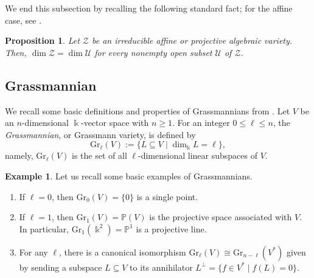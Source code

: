 \documentclass[a4,12pt]{amsart}
\numberwithin{equation}{section} %
\def\Gr{\mathrm{Gr}} %
\newtheorem{proposition}[theorem]{Proposition} %
\theoremstyle{definition} %
\newtheorem{example}[theorem]{Example} %
\begin{document}
We end this subsection by recalling the following standard fact; for the affine case, see \cite[Chapter~I, Proposition~1.10]{Hartshorne-book-1977}. 

\begin{proposition}\label{prop:open-subset-dim}
Let $\mathcal{Z}$ be an irreducible affine or projective algebraic variety. Then, $\dim \mathcal{Z}=\dim \mathcal{U}$ for every nonempty open subset $\mathcal{U}$ of $\mathcal{Z}$.
\end{proposition}


\subsection{Grassmannian}
We recall some basic definitions and properties of Grassmannians from \cite[Chapter 5]{LB-Grassmannian-book}. Let $V$ be an $n$-dimensional $\Bbbk$-vector space with $n\geq 1$. For an integer $0\leq \ell\leq n$, the \emph{Grassmannian}, or Grassmann variety, is defined by
\[
\Gr_\ell(V) := \bigl\{ L\subseteq V \;\big|\; \dim_{\Bbbk} L = \ell \bigr\},
\]
namely, $\Gr_\ell(V)$ is the set of all $\ell$-dimensional linear subspaces of $V$.

\begin{example}
Let us recall some basic examples of Grassmannians. 
\begin{enumerate}
\item If $\ell=0$, then $\Gr_0(V)=\{0\}$ is a single point. 

\item If $\ell=1$, then $\Gr_1(V)=\mathbb{P}(V)$ is the projective space associated with $V$. In particular, $\Gr_1(\Bbbk^2)=\mathbb{P}^1$ is a projective line.

\item For any $\ell$, there is a canonical isomorphism $\Gr_\ell(V)\cong\Gr_{n-\ell}(V^*)$ given by sending a subspace $L\subseteq V$ to its annihilator $L^\perp = \{ f\in V^* \mid f(L)=0 \}$. 
\end{enumerate}
\end{example}
\end{document}
